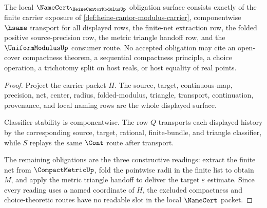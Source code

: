 \begin{theorem}
\label{thm:heine-cantor-modulus-namecert-obligations}
The local $\NameCert_{\HeineCantorModulusUp}$ obligation surface consists
exactly of the finite carrier exposure of
\autoref{def:heine-cantor-modulus-carrier}, componentwise $\hsame$ transport
for all displayed rows, the finite-net extraction row, the folded positive
source-precision row, the metric triangle handoff row, and the
$\UniformModulusUp$ consumer route. No accepted obligation may cite an
open-cover compactness theorem, a sequential compactness principle, a choice
operation, a trichotomy split on host reals, or host equality of real points.
\end{theorem}
\begin{proof}
Project the carrier packet $H$. The source, target, continuous-map,
precision, net, center, radius, folded-modulus, triangle, transport,
continuation, provenance, and local naming rows are the whole displayed
surface.

Classifier stability is componentwise. The row $Q$ transports each displayed
history by the corresponding source, target, rational, finite-bundle, and
triangle classifier, while $S$ replays the same $\Cont$ route after transport.

The remaining obligations are the three constructive readings: extract the
finite net from $\CompactMetricUp$, fold the pointwise radii in the finite
list to obtain $M$, and apply the metric triangle handoff to deliver the
target $\varepsilon$ estimate. Since every reading uses a named coordinate of
$H$, the excluded compactness and choice-theoretic routes have no readable
slot in the local $\NameCert$ packet.
\end{proof}

